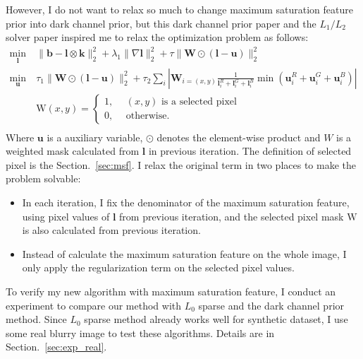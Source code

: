 \documentclass[journal, onecolumn, 10pt]{IEEEtran}
\begin{document}
However, I do not want to relax so much to change maximum saturation feature prior into dark channel prior, but this dark channel prior paper\cite{pan2016blind} and the $L_1/L_2$ solver paper\cite{krishnan2011blind} inspired me to relax the optimization problem as follows:
\begin{equation}
\begin{split}
\min_{\mathbf{l}} ~&\| \mathbf{b} - \mathbf{l} \otimes \mathbf{k} \|_2^2 + \lambda_1 \|\nabla \mathbf{l}\|_2^2 + \tau \|\mathbf{W} \odot (\mathbf{l} - \mathbf{u})\|_2^2 \\
\min_{\mathbf{u}} ~&\tau_1 \|\mathbf{W} \odot (\mathbf{l} - \mathbf{u}) \|^2_2 + \tau_2 \sum_i| \mathbf{W}_{i = (x, y)}\frac{1}{\mathbf{l}_i^R + \mathbf{l}_i^G + \mathbf{l}_i^B}\min(\mathbf{u}_i^R + \mathbf{u}_i^G + \mathbf{u}_i^B)| \\
&\text{W}(x, y) = \begin{cases}
1, &~~ (x, y) \text{ is a selected pixel} \\
0, &~~ \text{otherwise}.
\end{cases}\\
\end{split}
\label{eqn:ms_objective_function_reformulate}
\end{equation}
Where $\mathbf{u}$ is a auxiliary variable, $\odot$ denotes the element-wise product and $W$ is a weighted mask calculated from $\mathbf{l}$ in previous iteration. The definition of selected pixel is the Section.~\ref{sec:msf}. I relax the original term in two places to make the problem solvable:
\begin{itemize}
\item In each iteration, I fix the denominator of the maximum saturation feature, using pixel values of $\mathbf{l}$ from previous iteration, and the selected pixel mask $\text{W}$ is also calculated from previous iteration.
\item Instead of calculate the maximum saturation feature on the whole image, I only apply the regularization term on the selected pixel values.
\end{itemize}

To verify my new algorithm with maximum saturation feature, I conduct an experiment to compare our method with $L_0$ sparse\cite{xu2013unnatural} and the dark channel prior method\cite{pan2016blind}. Since $L_0$ sparse method already works well for synthetic dataset, I use some real blurry image to test these algorithms. Details are in Section.~\ref{sec:exp_real}.
\end{document}
